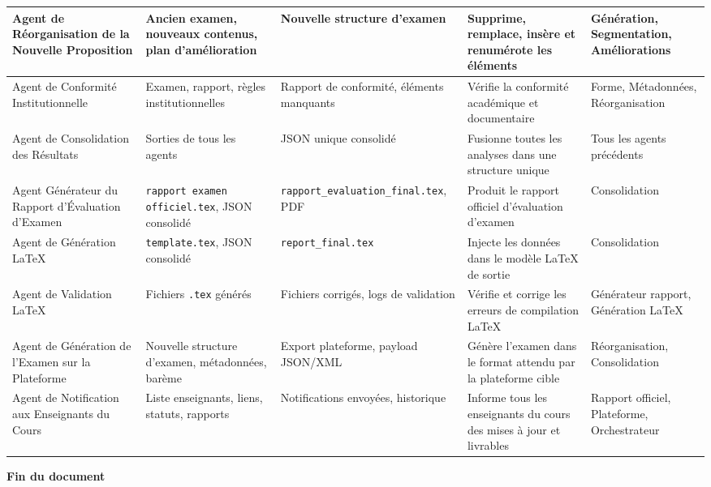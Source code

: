\documentclass[12pt,a4paper]{article}
\begin{document}
\begin{center}
\begin{longtable}{|p{3.2cm}|p{3.2cm}|p{3.2cm}|p{4.8cm}|p{2.8cm}|}
Agent de Réorganisation de la Nouvelle Proposition
& Ancien examen, nouveaux contenus, plan d’amélioration
& Nouvelle structure d’examen
& Supprime, remplace, insère et renumérote les éléments
& Génération, Segmentation, Améliorations \\ \hline

Agent de Conformité Institutionnelle
& Examen, rapport, règles institutionnelles
& Rapport de conformité, éléments manquants
& Vérifie la conformité académique et documentaire
& Forme, Métadonnées, Réorganisation \\ \hline

Agent de Consolidation des Résultats
& Sorties de tous les agents
& JSON unique consolidé
& Fusionne toutes les analyses dans une structure unique
& Tous les agents précédents \\ \hline

Agent Générateur du Rapport d’Évaluation d’Examen
& \texttt{rapport examen officiel.tex}, JSON consolidé
& \texttt{rapport\_evaluation\_final.tex}, PDF
& Produit le rapport officiel d’évaluation d’examen
& Consolidation \\ \hline

Agent de Génération LaTeX
& \texttt{template.tex}, JSON consolidé
& \texttt{report\_final.tex}
& Injecte les données dans le modèle LaTeX de sortie
& Consolidation \\ \hline

Agent de Validation LaTeX
& Fichiers \texttt{.tex} générés
& Fichiers corrigés, logs de validation
& Vérifie et corrige les erreurs de compilation LaTeX
& Générateur rapport, Génération LaTeX \\ \hline

Agent de Génération de l’Examen sur la Plateforme
& Nouvelle structure d’examen, métadonnées, barème
& Export plateforme, payload JSON/XML
& Génère l’examen dans le format attendu par la plateforme cible
& Réorganisation, Consolidation \\ \hline

Agent de Notification aux Enseignants du Cours
& Liste enseignants, liens, statuts, rapports
& Notifications envoyées, historique
& Informe tous les enseignants du cours des mises à jour et livrables
& Rapport officiel, Plateforme, Orchestrateur \\ \hline

\end{longtable}
\normalsize
\textbf{Fin du document}
\end{center}
\end{document}
